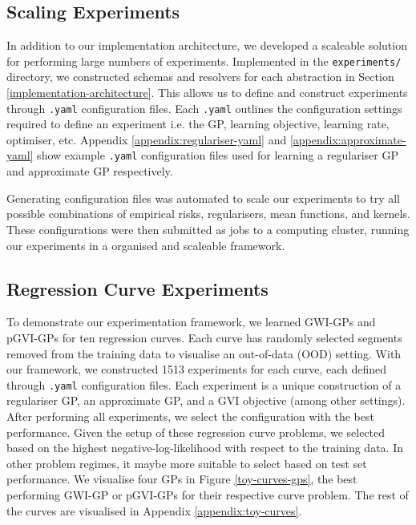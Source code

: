\documentclass{article}
\def\code#1{\texttt{#1}}
\numberwithin{equation}{section}
\begin{document}
\subsection{Scaling Experiments}
In addition to our implementation architecture, we developed a scaleable solution for performing large numbers of experiments.
Implemented in the \code{experiments/} directory, we constructed schemas and resolvers for each abstraction in Section \ref{implementation-architecture}.
This allows us to define and construct experiments through \code{.yaml} configuration files.
Each \code{.yaml} outlines the configuration settings required to define an experiment i.e. the GP, learning objective, learning rate, optimiser, etc. Appendix \ref{appendix:regulariser-yaml} and \ref{appendix:approximate-yaml} show example \code{.yaml} configuration files used for learning a regulariser GP and approximate GP respectively.

Generating configuration files was automated to scale our experiments to try all possible combinations of empirical risks, regularisers, mean functions, and kernels. These configurations were then submitted as jobs to a computing cluster, running our experiments in a organised and scaleable framework.

\subsection{Regression Curve Experiments}
To demonstrate our experimentation framework, we learned GWI-GPs and pGVI-GPs for ten regression curves. 
Each curve has randomly selected segments removed from the training data to visualise an out-of-data (OOD) setting.
With our framework, we constructed 1513 experiments for each curve, each defined through \code{.yaml} configuration files. 
Each experiment is a unique construction of a regulariser GP, an approximate GP, and a GVI objective (among other settings). 
After performing all experiments, we select the configuration with the best performance. 
Given the setup of these regression curve problems, we selected based on the highest negative-log-likelihood with respect to the training data. 
In other problem regimes, it maybe more suitable to select based on test set performance. 
We visualise four GPs in Figure \ref{toy-curves-gps}, the best performing GWI-GP or pGVI-GPs for their respective curve problem. 
The rest of the curves are visualised in Appendix \ref{appendix:toy-curves}.
\end{document}
